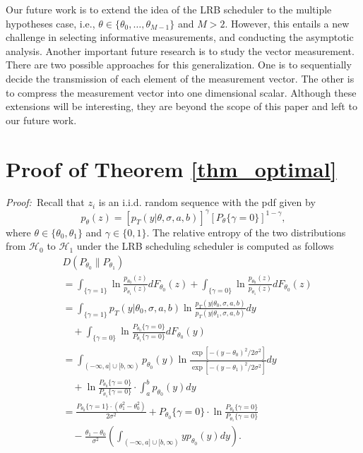 \documentclass[journal]{IEEEtran}
\def\cH{\mathcal{H}}
\begin{document}
Our future work is to extend the idea of the LRB scheduler to the multiple hypotheses case, i.e., $\theta\in\{\theta_0,\ldots,\theta_{M-1}\}$ and $M>2$. However, this entails a new challenge in selecting informative measurements, and conducting the asymptotic analysis. Another important future research is to study the vector measurement. There are two possible approaches for this generalization.  One is to sequentially decide the transmission of each element of the measurement vector.  The other is to compress the measurement vector into one dimensional scalar. Although these extensions will be interesting, they are beyond the scope of this paper and left to our future work.

\appendices
\section{Proof of Theorem \ref{thm_optimal}}
{\em Proof:}~Recall that $z_{i}$ is an i.i.d. random sequence with the pdf given by
\begin{equation*}
{p_{{\theta }}}(z) = {\left[ {{p_{T}}(y|\theta,\sigma ,a,b)} \right]^\gamma }{\left[ {P_{
\theta}\{{\gamma} = 0\}} \right]^{1 - \gamma }},
\end{equation*}
where $ \theta\in\{\theta_0, \theta_1\}$ and $\gamma\in\{0, 1\}$.
The relative entropy of the two distributions  from $\cH_0$ to $\cH_1$ under the LRB scheduling scheduler is computed as follows
\begin{equation*}
\begin{split}
&D({P_{\theta_0}}\lVert{P_{\theta_1}})\\
&=\int_{\{\gamma  = 1\}} {\ln\frac{{{p_{{\theta _0}}}(z)}}{{{p_{{\theta _1}}}(z)}}d{F_{{\theta _0}}}(z)}  + \int_{\{\gamma  = 0\}} {\ln\frac{{{p_{{\theta _0}}}(z)}}{{{p_{{\theta _1}}}(z)}}d{F_{{\theta _0}}}(z)} \\
&=\int_{\{\gamma  = 1\}} {{p_T}(y|{\theta _0},\sigma ,a,b)\ln\frac{{{p_T}(y|{\theta _0},\sigma ,a,b)}}{{{p_T}(y|{\theta _1},\sigma ,a,b)}}dy} \\
&\quad+ \int_{\{\gamma  = 0\}} {\ln\frac{{{P_{{\theta _0}}}\{\gamma  = 0\}}}{{{P_{{\theta _1}}}\{\gamma  = 0\}}}d{F_{{\theta _0}}}(y)}\\
&= \int_{( - \infty ,a] \cup [b,\infty )}^{} {{p_{{\theta _0}}}(y)\ln \frac{{\exp [ - {{(y - {\theta _0})}^2}/2{\sigma ^2}]}}{{\exp [ - {{(y - {\theta _1})}^2}/2{\sigma ^2}]}}}dy\\
&\quad + \ln\frac{{{P_{{\theta _0}}}\{\gamma  = 0\}}}{{{P_{{\theta _1}}}\{\gamma  = 0\}}} \cdot \int_a^b {{p_{{\theta _0}}}(y)} dy\\
&=\frac{{{P_{{\theta _0}}}\{\gamma  = 1\}\cdot(\theta _1^2 - \theta _0^2)}}{{2{\sigma ^2}}} +P_{{\theta _0}}\{\gamma=0\}\cdot\ln\frac{{{P_{{\theta _0}}}\{\gamma  = 0\}}}{{{P_{{\theta _1}}}\{\gamma  = 0\}}}\\
& \quad- \frac{{{\theta _1} - {\theta _0}}}{{{\sigma ^2}}}\left( {\int_{( - \infty ,a] \cup [b,\infty )}^{} {y{p_{\theta_{0}}}(y)dy} } \right).\\
\end{split}
\end{equation*}
\end{document}
